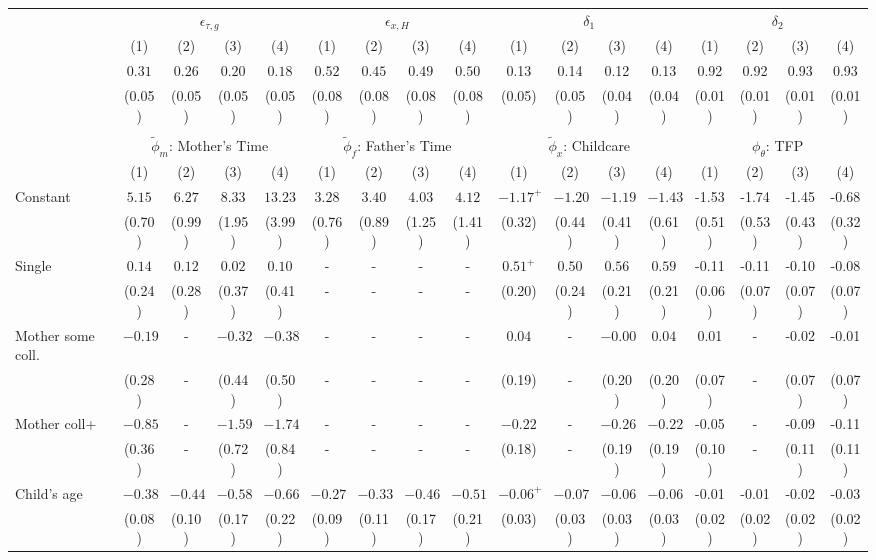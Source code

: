 \begin{tabular}{lcccccccccccccccc}\\\toprule
 & \multicolumn{4}{c}{$\epsilon_{\tau,g}$} & \multicolumn{4}{c}{$\epsilon_{x,H}$} & \multicolumn{4}{c}{$\delta_{1}$} & \multicolumn{4}{c}{$\delta_{2}$} \\
&(1)&(2)&(3)&(4)&(1)&(2)&(3)&(4)&(1)&(2)&(3)&(4)&(1)&(2)&(3)&(4)\\\cmidrule(r){2-5}\cmidrule(r){6-9}\cmidrule(r){10-13}\cmidrule(r){14-17}
&$0.31$&$0.26$&$0.20$&$0.18$&$0.52$&$0.45$&$0.49$&$0.50$&0.13&0.14&0.12&0.13&0.92&0.92&0.93&0.93\\
&(0.05)&(0.05)&(0.05)&(0.05)&(0.08)&(0.08)&(0.08)&(0.08)&(0.05)&(0.05)&(0.04)&(0.04)&(0.01)&(0.01)&(0.01)&(0.01)\\
&&&&&&&&&&&&&&&&\\
 & \multicolumn{4}{c}{$\tilde{\phi}_{m}$: Mother's Time} & \multicolumn{4}{c}{$\tilde{\phi}_{f}$: Father's Time} & \multicolumn{4}{c}{$\tilde{\phi}_{x}$: Childcare} & \multicolumn{4}{c}{$\phi_{\theta}$: TFP} \\
&(1)&(2)&(3)&(4)&(1)&(2)&(3)&(4)&(1)&(2)&(3)&(4)&(1)&(2)&(3)&(4)\\\cmidrule(r){2-5}\cmidrule(r){6-9}\cmidrule(r){10-13}\cmidrule(r){14-17}
Constant&$5.15$&$6.27$&$8.33$&$13.23$&$3.28$&$3.40$&$4.03$&$4.12$&$-1.17^{+}$&$-1.20$&$-1.19$&$-1.43$&-1.53&-1.74&-1.45&-0.68\\
&(0.70)&(0.99)&(1.95)&(3.99)&(0.76)&(0.89)&(1.25)&(1.41)&(0.32)&(0.44)&(0.41)&(0.61)&(0.51)&(0.53)&(0.43)&(0.32)\\
Single&$0.14$&$0.12$&$0.02$&$0.10$&-&-&-&-&$0.51^{+}$&$0.50$&$0.56$&$0.59$&-0.11&-0.11&-0.10&-0.08\\
&(0.24)&(0.28)&(0.37)&(0.41)&-&-&-&-&(0.20)&(0.24)&(0.21)&(0.21)&(0.06)&(0.07)&(0.07)&(0.07)\\
Mother some coll.&$-0.19$&-&$-0.32$&$-0.38$&-&-&-&-&$0.04$&-&$-0.00$&$0.04$&0.01&-&-0.02&-0.01\\
&(0.28)&-&(0.44)&(0.50)&-&-&-&-&(0.19)&-&(0.20)&(0.20)&(0.07)&-&(0.07)&(0.07)\\
Mother coll+&$-0.85$&-&$-1.59$&$-1.74$&-&-&-&-&$-0.22$&-&$-0.26$&$-0.22$&-0.05&-&-0.09&-0.11\\
&(0.36)&-&(0.72)&(0.84)&-&-&-&-&(0.18)&-&(0.19)&(0.19)&(0.10)&-&(0.11)&(0.11)\\
Child's age&$-0.38$&$-0.44$&$-0.58$&$-0.66$&$-0.27$&$-0.33$&$-0.46$&$-0.51$&$-0.06^{+}$&$-0.07$&$-0.06$&$-0.06$&-0.01&-0.01&-0.02&-0.03\\
&(0.08)&(0.10)&(0.17)&(0.22)&(0.09)&(0.11)&(0.17)&(0.21)&(0.03)&(0.03)&(0.03)&(0.03)&(0.02)&(0.02)&(0.02)&(0.02)\\

\end{tabular}
